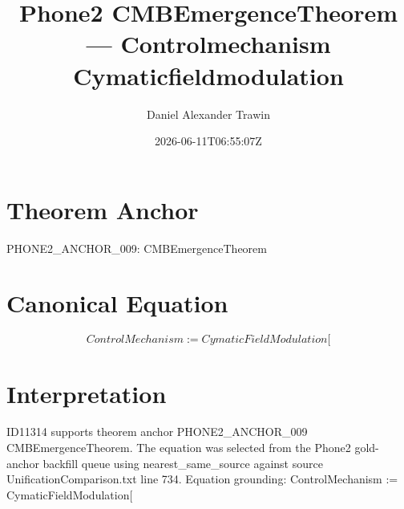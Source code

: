 \documentclass[11pt]{article}
\title{Phone2 CMBEmergenceTheorem — Controlmechanism Cymaticfieldmodulation}
\author{Daniel Alexander Trawin}
\date{2026-06-11T06:55:07Z}
\begin{document}
\maketitle
\section*{Theorem Anchor}
PHONE2_ANCHOR_009: CMBEmergenceTheorem
\section*{Canonical Equation}
\[
ControlMechanism := CymaticFieldModulation[
\]
\section*{Interpretation}
ID11314 supports theorem anchor PHONE2_ANCHOR_009 CMBEmergenceTheorem. The equation was selected from the Phone2 gold-anchor backfill queue using nearest_same_source against source UnificationComparison.txt line 734. Equation grounding: ControlMechanism := CymaticFieldModulation[
\end{document}
